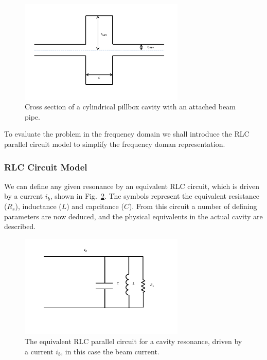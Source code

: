 \begin{figure}
\begin{center}
\includegraphics[width=0.7\textwidth]{Wakefields_and_Impedances/figures/pillbox-cav.pdf}
\end{center}
\caption{Cross section of a cylindrical pillbox cavity with an attached beam pipe.}
\label{fig:cylin_geo_diagram}
\end{figure}

To evaluate the problem in the frequency domain we shall introduce the RLC parallel circuit model to simplify the frequency doman representation.

\subsubsection{RLC Circuit Model}

We can define any given resonance by an equivalent RLC circuit, which is driven by a current $i_{b}$, shown in Fig.~\ref{fig:rlc_circ}. The symbols represent the equivalent resistance ($R_{s}$), inductance ($L$) and capcitance ($C$). From this circuit a number of defining parameters are now deduced, and the physical equivalents in the actual cavity are described.

\begin{figure}
\begin{center}
\includegraphics[width=0.7\textwidth]{Wakefields_and_Impedances/figures/equiv-circuit.pdf}
\end{center}
\caption{The equivalent RLC parallel circuit for a cavity resonance, driven by a current $i_{b}$, in this case the beam current.}
\label{fig:rlc_circ}
\end{figure}

